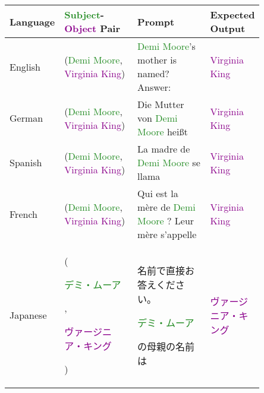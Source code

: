 \begin{table*}[htbp]
\scriptsize
\centering
\setlength{\tabcolsep}{1.0mm}{}
\begin{center}
\begin{tabular}{m{0.10\linewidth} p{0.30\linewidth} p{0.30\linewidth} m{0.15\linewidth}}
\textbf{Language} & \textbf{\textcolor{forestgreen}{Subject}-\textcolor{darkmagenta}{Object} Pair} & \textbf{Prompt} & \textbf{Expected Output} \\
\toprule
{\centering English} 
    & {\raggedright (\textcolor{forestgreen}{Demi Moore}, \textcolor{darkmagenta}{Virginia King})}
    & \textcolor{forestgreen}{Demi Moore}'s mother is named? \newline Answer:
    & {\centering \textcolor{darkmagenta}{Virginia King}} \\
\midrule
{\centering German} 
    & {\raggedright (\textcolor{forestgreen}{Demi Moore}, \textcolor{darkmagenta}{Virginia King})}
    & Die Mutter von \textcolor{forestgreen}{Demi Moore} heißt
    & {\centering \textcolor{darkmagenta}{Virginia King}} \\
\midrule
{\centering Spanish} 
    & {\raggedright (\textcolor{forestgreen}{Demi Moore}, \textcolor{darkmagenta}{Virginia King})}
    & La madre de \textcolor{forestgreen}{Demi Moore} se llama
    & {\centering \textcolor{darkmagenta}{Virginia King}} \\
\midrule
{\centering French} 
    & {\raggedright (\textcolor{forestgreen}{Demi Moore}, \textcolor{darkmagenta}{Virginia King})}
    & Qui est la mère de \textcolor{forestgreen}{Demi Moore} ? Leur mère s'appelle
    & {\centering \textcolor{darkmagenta}{Virginia King}} \\
\midrule
{\centering Japanese} 
    & {\raggedright (\textcolor{forestgreen}{\begin{CJK}{UTF8}{min}デミ・ムーア\end{CJK}}, \textcolor{darkmagenta}{\begin{CJK}{UTF8}{min}ヴァージニア・キング\end{CJK}})}
    & \begin{CJK}{UTF8}{min}名前で直接お答えください。\end{CJK}\textcolor{forestgreen}{\begin{CJK}{UTF8}{min}デミ・ムーア\end{CJK}}\begin{CJK}{UTF8}{min}の母親の名前は\end{CJK}
    & {\centering \textcolor{darkmagenta}{\begin{CJK}{UTF8}{min}ヴァージニア・キング\end{CJK}}} \\

\end{tabular}
\end{center}
\end{table*}
